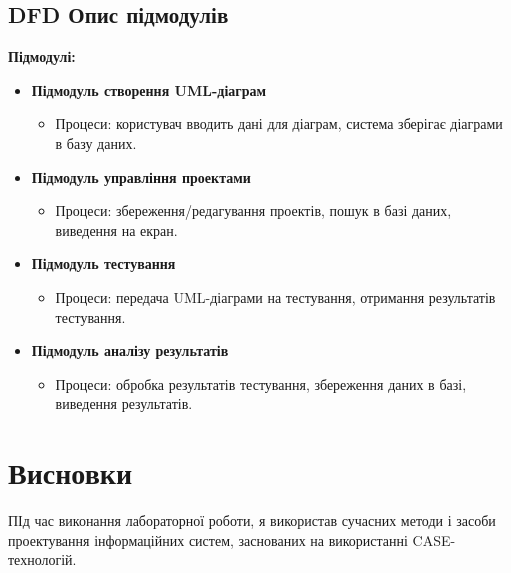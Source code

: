 \documentclass[oneside,14pt]{extarticle}
\begin{document}
\begin{normalsize}
    \subsection*{DFD Опис підмодулів}
    \textbf{Підмодулі:}
    \begin{itemize}
    	\item \textbf{Підмодуль створення UML-діаграм}
    	\begin{itemize}
    		\item Процеси: користувач вводить дані для діаграм, система зберігає діаграми в базу даних.
    	\end{itemize}
    	\item \textbf{Підмодуль управління проектами}
    	\begin{itemize}
    		\item Процеси: збереження/редагування проектів, пошук в базі даних, виведення на екран.
    	\end{itemize}
    	\item \textbf{Підмодуль тестування}
    	\begin{itemize}
    		\item Процеси: передача UML-діаграми на тестування, отримання результатів тестування.
    	\end{itemize}
    	\item \textbf{Підмодуль аналізу результатів}
    	\begin{itemize}
    		\item Процеси: обробка результатів тестування, збереження даних в базі, виведення результатів.
    	\end{itemize}
    \end{itemize}
    
	
	\section*{Висновки}
	ПІд час виконання лабораторної роботи, я використав сучасних методи і засоби проектування інформаційних систем, заснованих на використанні CASE-технологій.
	    
\end{normalsize}
\end{document}
